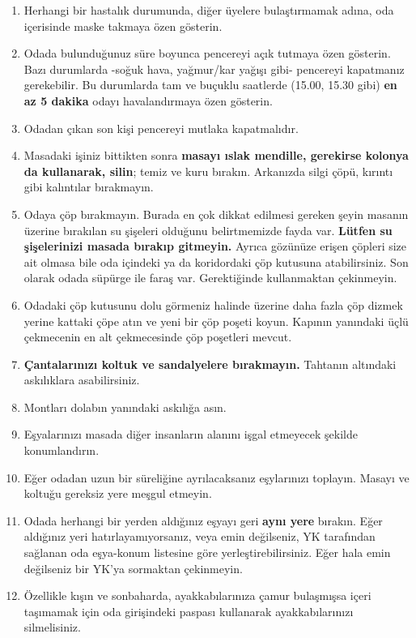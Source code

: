 \documentclass{article}
\begin{document}
\begin{enumerate}
    \item Herhangi bir hastalık durumunda, diğer üyelere bulaştırmamak adına, oda içerisinde maske takmaya özen gösterin.
    \item 	Odada bulunduğunuz süre boyunca pencereyi açık tutmaya özen gösterin. Bazı durumlarda -soğuk hava, yağmur/kar yağışı gibi- pencereyi kapatmanız gerekebilir. Bu durumlarda tam ve buçuklu saatlerde (15.00, 15.30 gibi) \textbf{en az 5 dakika} odayı havalandırmaya özen gösterin. 
    \item Odadan çıkan son kişi pencereyi mutlaka kapatmalıdır.
    \item Masadaki işiniz bittikten sonra \textbf{masayı ıslak mendille, gerekirse kolonya da kullanarak, silin}; temiz ve kuru bırakın. Arkanızda silgi çöpü, kırıntı gibi kalıntılar bırakmayın.
    \item Odaya çöp bırakmayın. Burada en çok dikkat edilmesi gereken şeyin masanın üzerine bırakılan su şişeleri olduğunu belirtmemizde fayda var. \textbf{Lütfen su şişelerinizi masada bırakıp gitmeyin.} Ayrıca gözünüze erişen çöpleri size ait olmasa bile oda içindeki ya da koridordaki çöp kutusuna atabilirsiniz. Son olarak odada süpürge ile faraş var. Gerektiğinde kullanmaktan çekinmeyin.
    \item Odadaki çöp kutusunu dolu görmeniz halinde üzerine daha fazla çöp dizmek yerine kattaki çöpe atın ve yeni bir çöp poşeti koyun. Kapının yanındaki üçlü çekmecenin en alt çekmecesinde çöp poşetleri mevcut.
    \item \textbf{Çantalarınızı koltuk ve sandalyelere bırakmayın.} Tahtanın altındaki askılıklara asabilirsiniz. 
    \item Montları dolabın yanındaki askılığa asın. 
    \item Eşyalarınızı masada diğer insanların alanını işgal etmeyecek şekilde konumlandırın.
    \item Eğer odadan uzun bir süreliğine ayrılacaksanız eşylarınızı toplayın. Masayı ve koltuğu gereksiz yere meşgul etmeyin.
    \item Odada herhangi bir yerden aldığınız eşyayı geri \textbf{aynı yere} bırakın. Eğer aldığınız yeri hatırlayamıyorsanız, veya emin değilseniz, YK tarafından sağlanan oda eşya-konum listesine göre yerleştirebilirsiniz. Eğer hala emin değilseniz bir YK'ya sormaktan çekinmeyin.
    \item Özellikle kışın ve sonbaharda, ayakkabılarınıza çamur bulaşmışsa içeri taşımamak için oda girişindeki paspası kullanarak ayakkabılarınızı silmelisiniz.
\end{enumerate}
\end{document}
